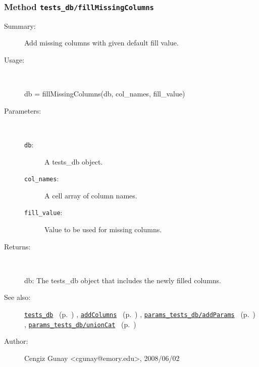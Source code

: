 \subsubsection[Method \texttt{fillMissingColumns}]{Method \texttt{tests\_db/fillMissingColumns}}%
%
\label{ref_tests_db__fillMissingColumns}%
\hypertarget{ref_tests_db__fillMissingColumns}{}%
\begin{description}
\item[Summary:]Add missing columns with given default fill value.
%
\item[Usage:]~%
\begin{lyxcode}%
db = fillMissingColumns(db, col\_names, fill\_value)
%
\end{lyxcode}%
%
%
\item[Parameters:]~
\begin{description}%
\item[\texttt{db}:]
 A tests\_db object.
\item[\texttt{col\_names}:]
 A cell array of column names.
\item[\texttt{fill\_value}:]
 Value to be used for missing columns.
\end{description}%
%
\item[Returns:
]~

	db: The tests\_db object that includes the newly filled columns.
%
%
\item[See also:]%
\hyperlink{ref_tests_db}{\texttt{tests\_db}}%
\ (p.~\pageref{ref_tests_db})%
%
, \hyperlink{ref_addColumns}{\texttt{addColumns}}%
\ (p.~\pageref{ref_addColumns})%
%
, \hyperlink{ref_params_tests_db__addParams}{\texttt{params\_tests\_db/addParams}}%
\ (p.~\pageref{ref_params_tests_db__addParams})%
%
, \hyperlink{ref_params_tests_db__unionCat}{\texttt{params\_tests\_db/unionCat}}%
\ (p.~\pageref{ref_params_tests_db__unionCat})%
%
%
\item[Author:]%
Cengiz Gunay <cgunay@emory.edu>, 2008/06/02 
%
\end{description}
\methodline%
